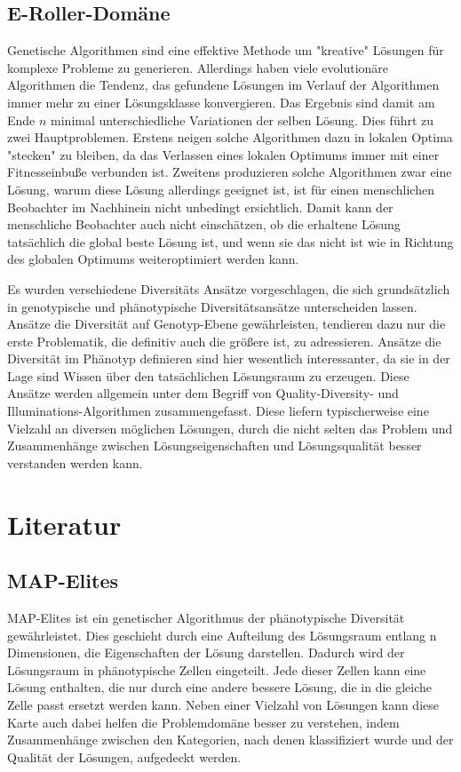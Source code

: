 \documentclass[12pt]{article}
\begin{document}
\subsection{E-Roller-Domäne}

Genetische Algorithmen sind eine effektive  Methode um "kreative" Lösungen für komplexe Probleme zu generieren.
Allerdings haben viele evolutionäre Algorithmen die Tendenz, das gefundene Lösungen im Verlauf der Algorithmen immer mehr zu einer Lösungsklasse konvergieren.
Das Ergebnis sind damit am Ende $n$ minimal unterschiedliche Variationen der selben Lösung.
Dies führt zu zwei Hauptproblemen. Erstens neigen solche Algorithmen dazu in lokalen Optima "stecken" zu bleiben, da das Verlassen eines lokalen Optimums immer mit einer Fitnesseinbuße verbunden ist.
Zweitens produzieren solche Algorithmen zwar eine Lösung, warum diese Lösung allerdings geeignet ist, ist für einen menschlichen Beobachter im Nachhinein nicht unbedingt ersichtlich.
Damit kann der menschliche Beobachter auch nicht einschätzen, ob die erhaltene Lösung tatsächlich die global beste Lösung ist, und wenn sie das nicht ist wie in Richtung des globalen Optimums weiteroptimiert werden kann.

Es wurden verschiedene Diversitäts Ansätze vorgeschlagen, die sich grundsätzlich in genotypische und phänotypische Diversitätsansätze unterscheiden lassen.
Ansätze die Diversität auf Genotyp-Ebene gewährleisten, tendieren dazu nur die erste Problematik, die definitiv auch die größere ist, zu adressieren.
Ansätze die Diversität im Phänotyp definieren sind hier wesentlich interessanter, da sie in der Lage sind Wissen über den tatsächlichen Lösungsraum zu erzeugen.
Diese Ansätze werden allgemein unter dem Begriff von Quality-Diversity- und Illuminations-Algorithmen zusammengefasst.
Diese liefern typischerweise eine Vielzahl an diversen möglichen Lösungen, durch die nicht selten das Problem und Zusammenhänge zwischen Lösungseigenschaften und Lösungsqualität besser verstanden werden kann.

 
\section{Literatur}

\subsection{MAP-Elites}
\label{sub:mapElites}
MAP-Elites \cite{Mouret.4202015} ist ein genetischer Algorithmus der phänotypische Diversität gewährleistet.
Dies geschieht durch eine Aufteilung des Lösungsraum entlang n Dimensionen, die Eigenschaften der Lösung darstellen.
Dadurch wird der Lösungsraum in phänotypische Zellen eingeteilt.
Jede dieser Zellen kann eine Lösung enthalten, die nur durch eine andere bessere Lösung, die in die gleiche Zelle passt ersetzt werden kann.
Neben einer Vielzahl von Lösungen kann diese Karte auch dabei helfen die Problemdomäne besser zu verstehen, indem Zusammenhänge zwischen den Kategorien, nach denen klassifiziert wurde und der Qualität der Lösungen, aufgedeckt werden.
\end{document}
